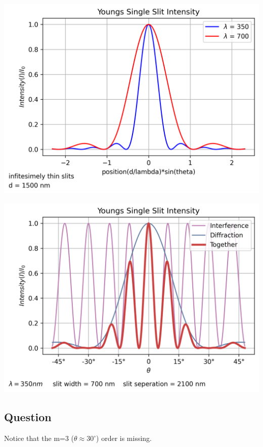 \documentclass{report}
\begin{document}
\begin{table}[H]
    \centering
    \includegraphics[width = \textwidth]{plot3.png}
\end{table}
\bigskip

\begin{table}[H]
    \centering
    \includegraphics[width = \textwidth]{plot4.png}
\end{table}
\bigskip

\subsection*{Question}
\label{Question}
Notice that the m=3 ($\theta \approx 30^\circ $) order is missing. \\
\end{document}
